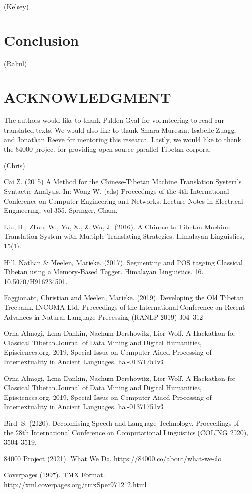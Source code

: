\documentclass[letterpaper, 12 pt, conference]{ieeeconf}  %
\begin{document}
(Kelsey)



\section{Conclusion}


(Rahul)




\section*{ACKNOWLEDGMENT}

The authors would like to thank Palden Gyal for volunteering to read our translated texts. We would also like to thank Smara Muresan, Isabelle Zuagg, and Jonathan Reeve for mentoring this research. Lastly, we would like to thank the 84000 project for providing open source parallel Tibetan corpora. 


(Chris)
\begin{thebibliography}{99}



 Cai Z. (2015) A Method for the Chinese-Tibetan Machine Translation System’s Syntactic Analysis. In: Wong W. (eds) Proceedings of the 4th International Conference on Computer Engineering and Networks. Lecture Notes in Electrical Engineering, vol 355. Springer, Cham. 

 Liu, H., Zhao, W., Yu, X., & Wu, J. (2016). A Chinese to Tibetan Machine Translation System with Multiple Translating Strategies. Himalayan Linguistics, 15(1).

 Hill, Nathan & Meelen, Marieke. (2017). Segmenting and POS tagging Classical Tibetan using a Memory-Based Tagger. Himalayan Linguistics. 16. 10.5070/H916234501. 

 Faggionato, Christian  and Meelen, Marieke. (2019). Developing the Old Tibetan Treebank. INCOMA Ltd. Proceedings of the International Conference on Recent Advances in Natural Language Processing (RANLP 2019) 304--312


 Orna Almogi, Lena Dankin, Nachum Dershowitz, Lior Wolf. A Hackathon for Classical Tibetan.Journal of Data Mining and Digital Humanities, Episciences.org, 2019, Special Issue on Computer-Aided Processing of Intertextuality in Ancient Languages. hal-01371751v3

 Orna Almogi, Lena Dankin, Nachum Dershowitz, Lior Wolf. A Hackathon for Classical Tibetan.Journal of Data Mining and Digital Humanities, Episciences.org, 2019, Special Issue on Computer-Aided Processing of Intertextuality in Ancient Languages. hal-01371751v3


 Bird, S. (2020). Decolonising Speech and Language Technology. Proceedings of the 28th International Conference on Computational Linguistics (COLING 2020), 3504–3519.


 84000 Project (2021). What We Do. https://84000.co/about/what-we-do


 Coverpages (1997). TMX Format. http://xml.coverpages.org/tmxSpec971212.html




\end{thebibliography}
\end{document}
